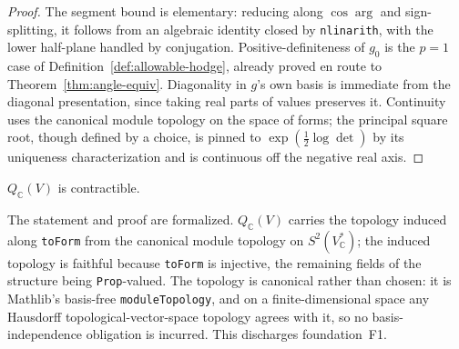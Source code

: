 \begin{proof}
  \leanok
  The segment bound is elementary: reducing along $\cos \arg$ and sign-splitting, it follows
  from an algebraic identity closed by \texttt{nlinarith}, with the lower half-plane handled
  by conjugation. Positive-definiteness of $g_0$ is the $p = 1$ case of
  Definition~\ref{def:allowable-hodge}, already proved en route to
  Theorem~\ref{thm:angle-equiv}. Diagonality in $g$'s own basis is immediate from the
  diagonal presentation, since taking real parts of values preserves it. Continuity uses the
  canonical module topology on the space of forms; the principal square root, though defined
  by a choice, is pinned to $\exp(\tfrac12 \log \det)$ by its uniqueness characterization
  and is continuous off the negative real axis.
\end{proof}

\begin{proposition}
  \label{prop:contractibility}
  \leanok
  $Q_{\mathbb C}(V)$ is contractible.

  The statement and proof are formalized. $Q_{\mathbb C}(V)$ carries the topology induced along
  \texttt{toForm} from the canonical module topology on
  $S^2(V^*_{\mathbb C})$; the induced topology is faithful because \texttt{toForm} is
  injective, the remaining fields of the structure being \texttt{Prop}-valued. The
  topology is canonical rather than chosen: it is Mathlib's basis-free
  \texttt{moduleTopology}, and on a finite-dimensional space any Hausdorff
  topological-vector-space topology agrees with it, so no basis-independence
  obligation is incurred. This discharges foundation~F1.
\end{proposition}


